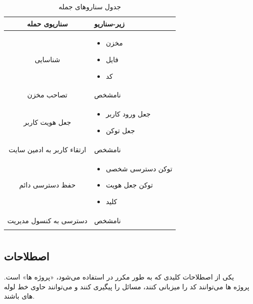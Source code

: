 \documentclass{CSICC}
\begin{document}
\begin{table}[H]
	\centering
	\caption{جدول سناروهای جمله}
	\label{tab:Enterprise_attacks}
	\begin{tabular}{cp{5cm}}\hline
		سناریوی حمله
		& زیر-سناریو
		\\\hline
		شناسایی
		& 
		\begin{itemize}
			\item
			مخزن
			\item 
			فایل
			\item 
			کد
		\end{itemize}
		\\
		تصاحب مخزن
		& 
		نامشخص
		\\
		جعل هویت کاربر
		& 
		\begin{itemize}
			\item
			جعل ورود کاربر
			\item 
			جعل توکن
		\end{itemize}
		\\
		ارتقاء کاربر به ادمین سایت
		& 
		نامشخص
		\\
		حفظ دسترسی دائم
		& 
		\begin{itemize}
			\item
			توکن دسترسی شخصی
			\item 
			توکن جعل هویت
			\item 
			کلید 
			\lr{SSH}
		\end{itemize}
		\\
		دسترسی به کنسول مدیریت
		& 
		نامشخص
		\\
		\\\hline
	\end{tabular}
\end{table}

\section {}
\subsection{اصطلاحات}
یکی از اصطلاحات کلیدی که به طور مکرر در
 استفاده می‌شود، «پروژه ‌ها» است.
پروژه ‌ها می‌توانند کد را میزبانی کنند، مسائل را پیگیری کنند و می‌توانند حاوی خط لوله ‌های
 باشند.
\end{document}
